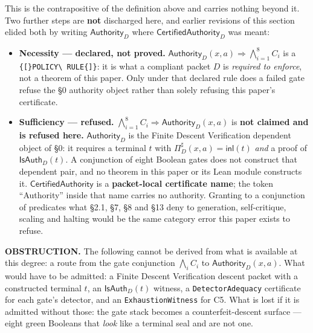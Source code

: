 \documentclass[
  10pt,
]{article}
\providecommand{\tightlist}{%
  \setlength{\itemsep}{0pt}\setlength{\parskip}{0pt}}
\providecommand{\tightlist}{%
  \setlength{\itemsep}{0pt}\setlength{\parskip}{0pt}}
\renewenvironment{quote}
  {\begin{leftbar}\small}
  {\end{leftbar}}
\DeclareRobustCommand{\texttt}[1]{{\paperSymbolFont\nolinkurl{#1}}}
\begin{document}
This is the contrapositive of the definition above and carries nothing beyond it. Two further steps are \textbf{not} discharged here, and earlier revisions of this section elided both by writing \protect\hypertarget{math-E0010-0125}{}{\(\mathsf{Authority}_D\)} where \protect\hypertarget{math-E0011-0126}{}{\(\mathsf{CertifiedAuthority}_D\)} was meant:

\begin{itemize}
\tightlist
\item
  \textbf{Necessity --- declared, not proved.} \protect\hypertarget{math-E0098-0127}{}{\(\mathsf{Authority}_D(x,a)\Rightarrow\bigwedge_{i=1}^{8}C_i\)} is a \texttt{{[}POLICY\ RULE{]}}: it is what a compliant packet \protect\hypertarget{math-E0009-0128}{}{\(D\)} is \emph{required to enforce}, not a theorem of this paper. Only under that declared rule does a failed gate refuse the §0 authority object rather than solely refusing this paper's certificate.
\item
  \textbf{Sufficiency --- refused.} \protect\hypertarget{math-E0099-0129}{}{\(\bigwedge_{i=1}^{8}C_i\Rightarrow\mathsf{Authority}_D(x,a)\)} is \textbf{not claimed and is refused here.} \protect\hypertarget{math-E0010-0130}{}{\(\mathsf{Authority}_D\)} is the Finite Descent Verification dependent object of §0: it requires a terminal \protect\hypertarget{math-E0100-0131}{}{\(t\)} with \protect\hypertarget{math-E0101-0132}{}{\(\Pi_D^\sharp(x,a)=\mathsf{inl}(t)\)} \emph{and} a proof of \protect\hypertarget{math-E0102-0133}{}{\(\mathsf{IsAuth}_D(t)\)}. A conjunction of eight Boolean gates does not construct that dependent pair, and no theorem in this paper or its Lean module constructs it. \protect\hypertarget{math-E0103-0134}{}{\(\mathsf{CertifiedAuthority}\)} is a \textbf{packet-local certificate name}; the token ``Authority'' inside that name carries no authority. Granting to a conjunction of predicates what §2.1, §7, §8 and §13 deny to generation, self-critique, scaling and halting would be the same category error this paper exists to refuse.
\end{itemize}

\begin{quote}
\textbf{OBSTRUCTION.} The following cannot be derived from what is available at this degree: a route from the gate conjunction \protect\hypertarget{math-E0104-0135}{}{\(\bigwedge_i C_i\)} to \protect\hypertarget{math-E0105-0136}{}{\(\mathsf{Authority}_D(x,a)\)}. What would have to be admitted: a Finite Descent Verification descent packet with a constructed terminal \protect\hypertarget{math-E0100-0137}{}{\(t\)}, an \protect\hypertarget{math-E0102-0138}{}{\(\mathsf{IsAuth}_D(t)\)} witness, a \texttt{DetectorAdequacy} certificate for each gate's detector, and an \texttt{ExhaustionWitness} for C5. What is lost if it is admitted without those: the gate stack becomes a counterfeit-descent surface --- eight green Booleans that \emph{look} like a terminal seal and are not one.
\end{quote}
\end{document}

